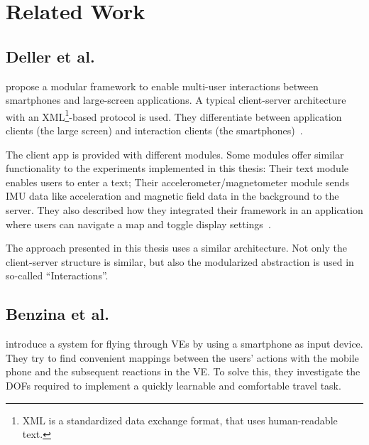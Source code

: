 \chapter{Related Work}\label{chapter:related-work}


\section{Deller et al.}\label{section:deller-2011}
\citeauthor{Deller.2011} propose a modular framework to enable multi-user interactions between smartphones and large-screen applications. A typical client-server architecture with an XML\footnote{XML is a standardized data exchange format, that uses human-readable text.}-based protocol is used. They differentiate between application clients (the large screen) and interaction clients (the smartphones)~\cite{Deller.2011}.

The client app is provided with different modules. Some modules offer similar functionality to the experiments implemented in this thesis: Their text module enables users to enter a text; Their accelerometer/magnetometer module sends \gls{IMU} data like acceleration and magnetic field data in the background to the server. They also described how they integrated their framework in an application where users can navigate a map and toggle display settings~\cite{Deller.2011}.

The approach presented in this thesis uses a similar architecture. Not only the client-server structure is similar, but also the modularized abstraction is used in so-called \enquote{Interactions}.


\section{Benzina et al.}\label{section:benzina-2011}
\citeauthor{Benzina.2011} introduce a system for flying through \glspl{VE} by using a smartphone as input device.
They try to find convenient mappings between the users' actions with the mobile phone and the subsequent reactions in the \gls{VE}. To solve this, they investigate the \glspl{DOF} required to implement a quickly learnable and comfortable travel task.

